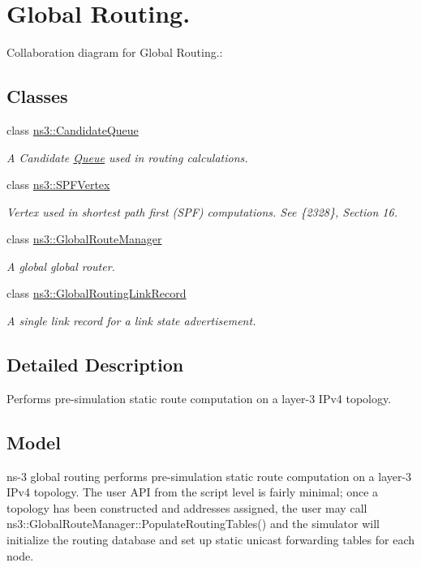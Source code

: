 \hypertarget{group__globalrouting}{}\section{Global Routing.}
\label{group__globalrouting}
Collaboration diagram for Global Routing.\+:
\subsection*{Classes}
\begin{DoxyCompactItemize}
\item 
class \hyperlink{classns3_1_1CandidateQueue}{ns3\+::\+Candidate\+Queue}
\begin{DoxyCompactList}\small\item\em A Candidate \hyperlink{classns3_1_1Queue}{Queue} used in routing calculations. \end{DoxyCompactList}\item 
class \hyperlink{classns3_1_1SPFVertex}{ns3\+::\+S\+P\+F\+Vertex}
\begin{DoxyCompactList}\small\item\em Vertex used in shortest path first (S\+PF) computations. See \{2328\}, Section 16. \end{DoxyCompactList}\item 
class \hyperlink{classns3_1_1GlobalRouteManager}{ns3\+::\+Global\+Route\+Manager}
\begin{DoxyCompactList}\small\item\em A global global router. \end{DoxyCompactList}\item 
class \hyperlink{classns3_1_1GlobalRoutingLinkRecord}{ns3\+::\+Global\+Routing\+Link\+Record}
\begin{DoxyCompactList}\small\item\em A single link record for a link state advertisement. \end{DoxyCompactList}\end{DoxyCompactItemize}


\subsection{Detailed Description}
Performs pre-\/simulation static route computation on a layer-\/3 I\+Pv4 topology.\hypertarget{group__nix-vector-routing_model}{}\subsection{Model}\label{group__nix-vector-routing_model}
ns-\/3 global routing performs pre-\/simulation static route computation on a layer-\/3 I\+Pv4 topology. The user A\+PI from the script level is fairly minimal; once a topology has been constructed and addresses assigned, the user may call ns3\+::\+Global\+Route\+Manager\+::\+Populate\+Routing\+Tables() and the simulator will initialize the routing database and set up static unicast forwarding tables for each node.

